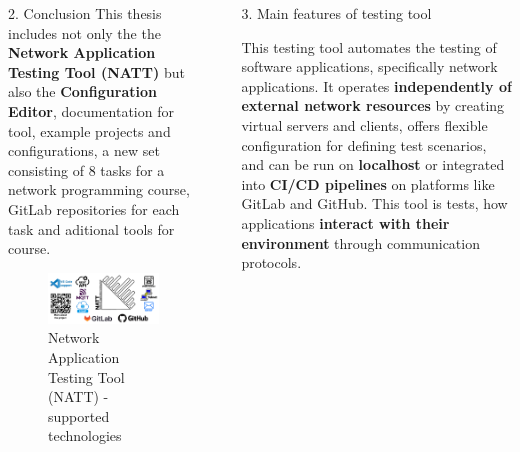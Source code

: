 \documentclass[final]{beamer}
\newlength{\sepwidth}
\newlength{\colwidth}
\newcommand{\separatorcolumn}{\begin{column}{\sepwidth}\end{column}}
\begin{document}
\begin{frame}[t]
\begin{columns}[t]
\begin{column}{\colwidth}
\begin{block}{2. Conclusion}
    \hspace{2em}This thesis includes not only the the \textbf{Network Application Testing Tool (NATT)} but also the 
    \textbf{Configuration Editor}, documentation for tool, example projects and configurations, a new set consisting of 8 tasks 
    for a network programming course, GitLab repositories for each task and aditional tools for course.

    \begin{figure}
      \centering
        \includegraphics[width=1.0\textwidth]{./imgs/natt-main-banner.png}
      \caption{Network Application Testing Tool (NATT) - supported technologies} 
    \end{figure}

  \end{block}

\end{column}

\separatorcolumn

\begin{column}{\colwidth}

  \begin{alertblock}{3. Main features of testing tool}

    This testing tool automates the testing of software applications, specifically network applications. 
    It operates \textbf{independently of external network resources} by creating virtual servers and clients,
    offers flexible configuration for defining test scenarios, and can be run on \textbf{localhost} or 
    integrated into \textbf{CI/CD pipelines} on platforms like GitLab and GitHub. This tool is tests, 
    how applications \textbf{interact with their environment} through communication protocols.


\end{alertblock}
\end{column}
\end{columns}
\end{frame}
\end{document}
